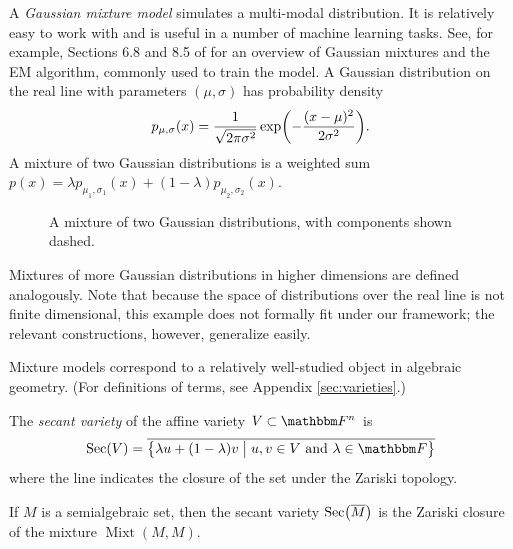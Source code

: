 \documentclass[11pt,titlepage]{article}
\newcommand*{\vbar}{\;\big\vert\;}
\DeclareMathOperator{\Mixt}{Mixt}
\DeclareMathOperator{\Sec}{Sec}
\numberwithin{equation}{section}
\begin{document}
    \begin{example}
    A \emph{Gaussian mixture model} simulates a multi-modal distribution.  It is
    relatively easy to work with and is useful in a number of machine learning
    tasks.  See, for example, Sections 6.8 and 8.5 of \cite{EOSL} for an
    overview of Gaussian mixtures and the EM algorithm, commonly used to train
    the model.  A Gaussian distribution on the real line with parameters $(\mu,
    \sigma)$ has probability density
    \[
        p_{\mu, \sigma}(x) = \frac{1}{\sqrt{2\pi\sigma^2}} 
        \exp\pdil*{-\frac{(x - \mu)^2}{2\sigma^2}}.
    \]
    A mixture of two Gaussian distributions is a weighted sum $p(x) = \lambda
    p_{\mu_1, \sigma_1}(x) + (1 - \lambda)p_{\mu_2, \sigma_2}(x)$.  
    \begin{figure}[H]
        \centering
        \caption{A mixture of two Gaussian distributions, with components shown
        dashed.}
    \end{figure}
    Mixtures of more Gaussian distributions in higher dimensions are defined
    analogously.  Note that because the space of distributions over the real
    line is not finite dimensional, this example does not formally fit under our
    framework; the relevant constructions, however, generalize easily.
    \end{example}

    Mixture models correspond to a relatively well-studied object in algebraic
    geometry.  (For definitions of terms, see Appendix \ref{sec:varieties}.)
    \begin{definition}
    The \emph{secant variety} of the affine variety $V \subset \F^n$ is
    \[
        \Sec(V) = \overline{\cdil[\big]{
        \lambda u + (1 - \lambda) v \vbar
        u,v \in V
        \text{ and }
        \lambda \in \F
        }}
    \]
    where the line indicates the closure of the set under the Zariski topology.  
    \end{definition}
    \begin{proposition}
    If $M$ is a semialgebraic set, then the secant variety
    $\Sec\pdil[\big]{\overline{M}}$ is the Zariski closure of the mixture
    $\Mixt(M, M)$.
    \end{proposition}
\end{document}
